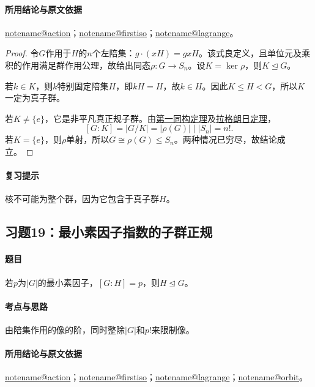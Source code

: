 \documentclass[UTF8,a4paper,11pt,fontset=windows]{ctexart}
\makeatletter
\newcommand{\noteref}[1]{\hyperref[note:#1]{\csname notename@#1\endcsname}}
\newcommand{\proofref}[2]{\hyperref[note:#1]{#2}}
\newcommand{\exref}[2]{\hyperref[ex:#1:#2]{第#1章习题#2}}
\makeatother
\begin{document}
\paragraph{所用结论与原文依据}
\noteref{action}；\noteref{firstiso}；\noteref{lagrange}。


\begin{proof}
令$G$作用于$H$的$n$个左陪集：$g\cdot(xH)=gxH$。该式良定义，且单位元及乘积的作用满足群作用公理，故给出同态$\rho:G\to S_n$。设$K=\ker\rho$，则$K\trianglelefteq G$。

若$k\in K$，则$k$特别固定陪集$H$，即$kH=H$，故$k\in H$。因此$K\leq H<G$，所以$K$一定为真子群。

若$K\ne\{e\}$，它是非平凡真正规子群。由\proofref{firstiso}{第一同构定理}及\proofref{lagrange}{拉格朗日定理}，
\[
[G:K]=|G/K|=|\rho(G)|\mid|S_n|=n!.
\]
若$K=\{e\}$，则$\rho$单射，所以$G\cong\rho(G)\leq S_n$。两种情况已穷尽，故结论成立。
\end{proof}

\paragraph{复习提示}
核不可能为整个群，因为它包含于真子群$H$。


\subsection{习题19：\texorpdfstring{最小素因子指数的子群正规}{最小素因子指数的子群正规}}
\label{ex:2:19}

\paragraph{题目}
若$p$为$|G|$的最小素因子，$[G:H]=p$，则$H\trianglelefteq G$。

\paragraph{考点与思路}
由陪集作用的像的阶，同时整除$|G|$和$p!$来限制像。

\paragraph{所用结论与原文依据}
\noteref{action}；\noteref{firstiso}；\noteref{lagrange}；\noteref{orbit}。

\end{document}
